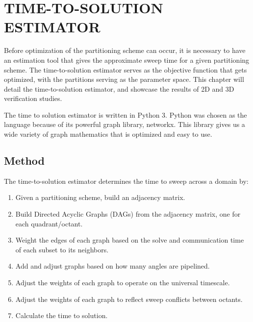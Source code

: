 %
%
%
%
 \setcounter{MaxMatrixCols}{30}
\newcommand{\tcr}[1]{\textcolor{red}{#1}}


\chapter{TIME-TO-SOLUTION ESTIMATOR \label{cha:tts}}

Before optimization of the partitioning scheme can occur, it is necessary to have an estimation tool that gives the approximate sweep time for a given partitioning scheme. The time-to-solution estimator serves as the objective function that gets optimized, with the partitions serving as the parameter space. This chapter will detail the time-to-solution estimator, and showcase the results of 2D and 3D verification studies. 

The time to solution estimator is written in Python 3. Python was chosen as the language because of its powerful graph library, networkx. 
This library gives us a wide variety of graph mathematics that is optimized and easy to use. 

\section{Method}
The time-to-solution estimator determines the time to sweep across a domain by:
\begin{enumerate}
	\item Given a partitioning scheme, build an adjacency matrix.
	\item Build Directed Acyclic Graphs  (DAGs) from the adjacency matrix, one for each quadrant/octant.
	\item Weight the edges of each graph based on the solve and communication time of each subset to its neighbors.
     \item Add and adjust graphs based on how many angles are pipelined.
	\item Adjust the weights of each graph to operate on the universal timescale.
	\item Adjust the weights of each graph to reflect sweep conflicts between octants. 
	\item Calculate the time to solution.
\end{enumerate}

